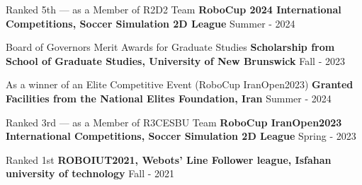 \begin{cventries}
    
    \cventry
    {Ranked 5th — as a Member of R2D2 Team}
    {\textbf {RoboCup 2024 International Competitions, Soccer Simulation 2D League}}
    {}
    {Summer - 2024}
    {}
    
    
    \cventry
    {Board of Governors Merit Awards for Graduate Studies}
    {\textbf {Scholarship from School of Graduate Studies, University of New Brunswick}}
    {}
    {Fall - 2023}
    {}

    \cventry
    {As a winner of an Elite Competitive Event (RoboCup IranOpen2023)}
    {\textbf {Granted Facilities from the National Elites Foundation, Iran}}
    {}
    {Summer - 2024}
    {}


    \cventry
    {Ranked 3rd — as a Member of R3CESBU Team}
    {\textbf {RoboCup IranOpen2023 International Competitions, Soccer Simulation 2D League}}
    {}
    {Spring - 2023}
    {}

    

    
    \cventry
    {Ranked 1st}
    {\textbf {ROBOIUT2021, Webots’ Line Follower league, Isfahan university of technology}}
    {}
    {Fall - 2021}
    {}




\end{cventries}